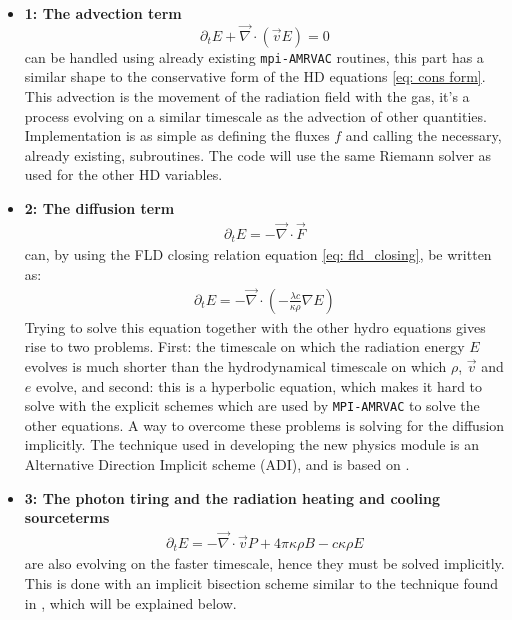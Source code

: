 \begin{itemize}
\item \textbf{1: The advection term}
\begin{equation}
\partial_t E + \vec{\nabla} \cdot \left( \vec{v} E \right) = 0
\end{equation}
can be handled using already existing \texttt{mpi-AMRVAC} routines, this part has a similar shape to the conservative form of the HD equations \eqref{eq: cons form}. This advection is the movement of the radiation field with the gas, it's a process evolving on a similar timescale as the advection of other quantities. Implementation is as simple as defining the fluxes $f$ and calling the necessary, already existing, subroutines. The code will use the same Riemann solver as used for the other HD variables.\\

\item \textbf{2: The diffusion term}
\begin{align}
\partial_t E = - \vec{\nabla} \cdot \vec{F}
\end{align}
can, by using the FLD closing relation equation \ref{eq: fld_closing}, be written as:
\begin{align}
\partial_t E = - \vec{\nabla} \cdot \left( -\frac{\lambda c}{\kappa \rho} \nabla E\right)
\end{align}
Trying to solve this equation together with the other hydro equations gives rise to two problems. First: the timescale on which the radiation energy $E$ evolves is much shorter than the hydrodynamical timescale on which $\rho$, $\vec{v}$ and $e$ evolve, and second: this is a hyperbolic equation, which makes it hard to solve with the explicit schemes which are used by \texttt{MPI-AMRVAC} to solve the other equations. A way to overcome these problems is solving for the diffusion implicitly. The technique used in developing the new physics module is an Alternative Direction Implicit scheme (ADI), and is based on \citep{Turner12001}.\\

\item \textbf{3: The photon tiring and the radiation heating and cooling sourceterms}
\begin{align}
\partial_t E = - \vec{\nabla} \cdot \vec{v} P + 4\pi \kappa\rho B - c \kappa \rho E
\end{align}
are also evolving on the faster timescale, hence they must be solved implicitly. This is done with an implicit bisection scheme similar to the technique found in \citep{Turner12001}, which will be explained below.
\end{itemize}

